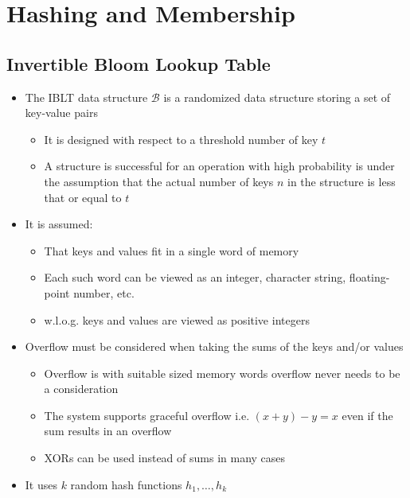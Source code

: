 \section{Hashing and Membership}
\subsection{Invertible Bloom Lookup Table}
\begin{itemize}
	\item The IBLT data structure $\mathcal B$ is a randomized data structure storing a set of key-value pairs
  \begin{itemize}
  	\item It is designed with respect to a threshold number of key $t$ 
    \item A structure is successful for an operation with high probability is under the assumption that the actual number of keys $n$ in the structure is less that or equal to $t$
  \end{itemize}
	\item It is assumed:
  \begin{itemize}
		\item That keys and values fit in a single word of memory
		\item Each such word can be viewed as an integer, character string, floating-point number, etc.
		\item w.l.o.g. keys and values are viewed as positive integers
  \end{itemize}
  \item Overflow must be considered when taking the sums of the keys and/or values
  \begin{itemize}
  	\item Overflow is with suitable sized memory words overflow never needs to be a consideration
    \item The system supports graceful overflow i.e. $(x+y) -y = x$ even if the sum results in an overflow
    \item XORs can be used instead of sums in many cases
  \end{itemize}
  \item It uses $k$ random hash functions $h_1, \dots, h_k$ 
\end{itemize}


